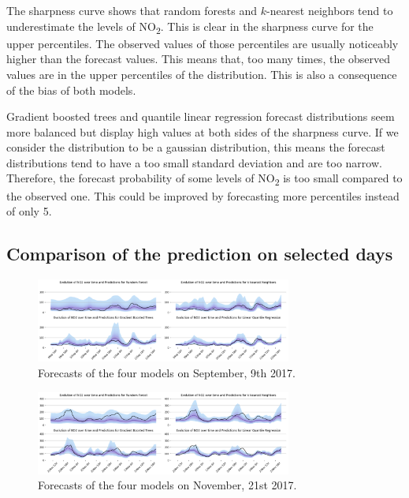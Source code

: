 \documentclass[a4paper,twocolumn,5p]{elsarticle}
\begin{document}
The sharpness curve shows that random forests and $k$-nearest
neighbors tend to underestimate the levels of
NO\textsubscript{2}. This is clear in the sharpness curve for the
upper percentiles. The observed values of those percentiles are
usually noticeably higher than the forecast values. This means that,
too many times, the observed values are in the upper percentiles of
the distribution. This is also a consequence of the bias of both
models.

Gradient boosted trees and quantile linear regression forecast
distributions seem more balanced but display high values at both sides
of the sharpness curve.  If we consider the distribution to be a
gaussian distribution, this means the forecast distributions tend to
have a too small standard deviation and are too narrow. Therefore, the
forecast probability of some levels of NO\textsubscript{2} is too
small compared to the observed one.  This could be improved by
forecasting more percentiles instead of only 5.

\subsection{Comparison of the prediction on selected days}

\begin{figure}
  \centering
  \includegraphics[width=0.75\textwidth]{evoday1}
  \caption{Forecasts of the four models on September, 9th
    2017. }
  \label{figure:evoday1} 
\end{figure}

\begin{figure}
  \centering
  \includegraphics[width=0.75\textwidth]{evoday2}
  \caption{Forecasts of the four models on November, 21st 2017.  }
  \label{figure:evoday2} 
\end{figure}
\end{document}
